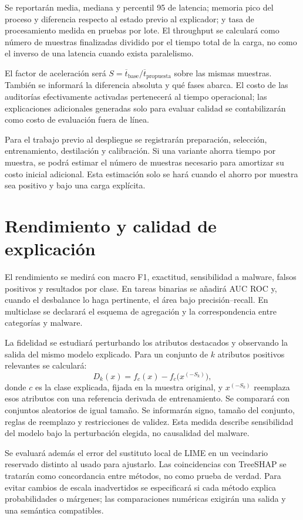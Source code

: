 Se reportarán media, mediana y percentil 95 de latencia; memoria pico del proceso y diferencia respecto al estado previo al explicador; y tasa de procesamiento medida en pruebas por lote. El throughput se calculará como número de muestras finalizadas dividido por el tiempo total de la carga, no como el inverso de una latencia cuando exista paralelismo.

El factor de aceleración será $S=\overline{t}_{\mathrm{base}}/\overline{t}_{\mathrm{propuesta}}$ sobre las mismas muestras. También se informará la diferencia absoluta y qué fases abarca. El costo de las auditorías efectivamente activadas pertenecerá al tiempo operacional; las explicaciones adicionales generadas solo para evaluar calidad se contabilizarán como costo de evaluación fuera de línea.

Para el trabajo previo al despliegue se registrarán preparación, selección, entrenamiento, destilación y calibración. Si una variante ahorra tiempo por muestra, se podrá estimar el número de muestras necesario para amortizar su costo inicial adicional. Esta estimación solo se hará cuando el ahorro por muestra sea positivo y bajo una carga explícita.

\section{Rendimiento y calidad de explicación}
El rendimiento se medirá con macro F1, exactitud, sensibilidad a malware, falsos positivos y resultados por clase. En tareas binarias se añadirá AUC ROC y, cuando el desbalance lo haga pertinente, el área bajo precisión--recall. En multiclase se declarará el esquema de agregación y la correspondencia entre categorías y malware.

La fidelidad se estudiará perturbando los atributos destacados y observando la salida del mismo modelo explicado. Para un conjunto de $k$ atributos positivos relevantes se calculará:
\begin{equation}
D_k(x)=f_c(x)-f_c\bigl(x^{(-S_k)}\bigr),
\end{equation}
donde $c$ es la clase explicada, fijada en la muestra original, y $x^{(-S_k)}$ reemplaza esos atributos con una referencia derivada de entrenamiento. Se comparará con conjuntos aleatorios de igual tamaño. Se informarán signo, tamaño del conjunto, reglas de reemplazo y restricciones de validez. Esta medida describe sensibilidad del modelo bajo la perturbación elegida, no causalidad del malware.

Se evaluará además el error del sustituto local de LIME en un vecindario reservado distinto al usado para ajustarlo. Las coincidencias con TreeSHAP se tratarán como concordancia entre métodos, no como prueba de verdad. Para evitar cambios de escala inadvertidos se especificará si cada método explica probabilidades o márgenes; las comparaciones numéricas exigirán una salida y una semántica compatibles.

